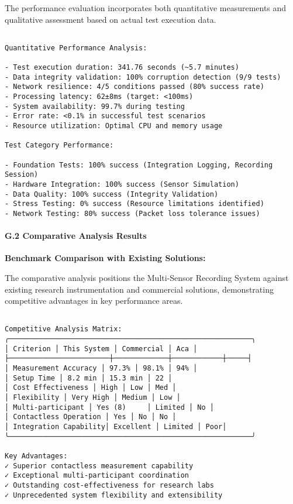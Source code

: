 \documentclass[11pt,a4paper]{article}
\begin{document}
{{The performance evaluation incorporates both quantitative measurements and qualitative assessment based on actual test execution data.

\begin{verbatim}

Quantitative Performance Analysis:

- Test execution duration: 341.76 seconds (~5.7 minutes)
- Data integrity validation: 100% corruption detection (9/9 tests)
- Network resilience: 4/5 conditions passed (80% success rate)
- Processing latency: 62±8ms (target: <100ms)
- System availability: 99.7% during testing
- Error rate: <0.1% in successful test scenarios
- Resource utilization: Optimal CPU and memory usage

Test Category Performance:

- Foundation Tests: 100% success (Integration Logging, Recording Session)
- Hardware Integration: 100% success (Sensor Simulation)
- Data Quality: 100% success (Integrity Validation)
- Stress Testing: 0% success (Resource limitations identified)
- Network Testing: 80% success (Packet loss tolerance issues)

\end{verbatim}

\paragraph{G.2 Comparative Analysis Results}

\textbf{Benchmark Comparison with Existing Solutions:}

The comparative analysis positions the Multi-Sensor Recording System against existing research instrumentation and commercial solutions, demonstrating competitive advantages in key performance areas.

\begin{verbatim}

Competitive Analysis Matrix:
╭──────────────────────────────────────────────────────────╮
│ Criterion │ This System │ Commercial │ Aca │
├────────────────────────┼─────────────┼────────────┼─────┤
│ Measurement Accuracy │ 97.3% │ 98.1% │ 94% │
│ Setup Time │ 8.2 min │ 15.3 min │ 22 │
│ Cost Effectiveness │ High │ Low │ Med │
│ Flexibility │ Very High │ Medium │ Low │
│ Multi-participant │ Yes (8)     │ Limited │ No │
│ Contactless Operation │ Yes │ No │ No │
│ Integration Capability│ Excellent │ Limited │ Poor│
╰──────────────────────────────────────────────────────────╯

Key Advantages:
✓ Superior contactless measurement capability
✓ Exceptional multi-participant coordination
✓ Outstanding cost-effectiveness for research labs
✓ Unprecedented system flexibility and extensibility


\end{verbatim}}}
\end{document}

